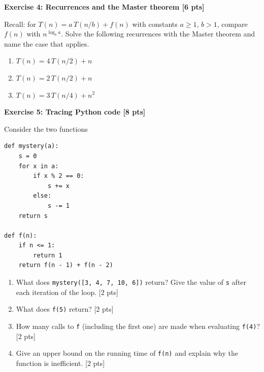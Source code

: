 \documentclass[11pt,a4paper]{article}
\newcommand{\exercise}[3]{\bigskip\par\noindent\textbf{Exercise #1: #2 [#3 pts]}\par\nopagebreak\smallskip}
\begin{document}
\exercise{4}{Recurrences and the Master theorem}{6}
Recall: for $T(n) = a\,T(n/b) + f(n)$ with constants $a \ge 1$, $b > 1$, compare $f(n)$ with
$n^{\log_b a}$. Solve the following recurrences with the Master theorem and name the case that applies.
\begin{enumerate}
  \item $T(n) = 4\,T(n/2) + n$
  \item $T(n) = 2\,T(n/2) + n$
  \item $T(n) = 3\,T(n/4) + n^2$
\end{enumerate}

\exercise{5}{Tracing Python code}{8}
Consider the two functions
\begin{lstlisting}
def mystery(a):
    s = 0
    for x in a:
        if x % 2 == 0:
            s += x
        else:
            s -= 1
    return s

def f(n):
    if n <= 1:
        return 1
    return f(n - 1) + f(n - 2)
\end{lstlisting}
\begin{enumerate}
  \item What does \texttt{mystery([3, 4, 7, 10, 6])} return? Give the value of \texttt{s} after each
        iteration of the loop. [2 pts]
  \item What does \texttt{f(5)} return? [2 pts]
  \item How many calls to \texttt{f} (including the first one) are made when evaluating \texttt{f(4)}? [2 pts]
  \item Give an upper bound on the running time of \texttt{f(n)} and explain why the function is
        inefficient. [2 pts]
\end{enumerate}
\end{document}
